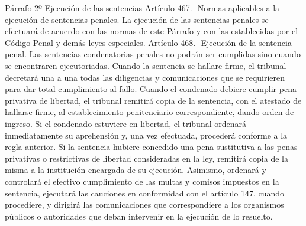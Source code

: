     Párrafo 2º Ejecución de las sentencias
    Artículo 467.- Normas aplicables a la ejecución de sentencias penales. La ejecución de las sentencias penales se efectuará de acuerdo con las normas de este Párrafo y con las establecidas por el Código Penal y demás leyes especiales.
    Artículo 468.- Ejecución de la sentencia penal. Las sentencias condenatorias penales no podrán ser cumplidas sino cuando se encontraren ejecutoriadas. Cuando la sentencia se hallare firme, el tribunal decretará una a una todas las diligencias y comunicaciones que se requirieren para dar total cumplimiento al fallo.
    Cuando el condenado debiere cumplir pena privativa de libertad, el tribunal remitirá copia de la sentencia, con el atestado de hallarse firme, al establecimiento penitenciario correspondiente, dando orden de ingreso. Si el condenado estuviere en libertad, el tribunal ordenará inmediatamente su aprehensión y, una vez efectuada, procederá conforme a la regla anterior.
    Si la sentencia hubiere concedido una pena sustitutiva a las penas privativas o restrictivas de libertad consideradas en la ley, remitirá copia de la misma a la institución encargada de su ejecución.
    Asimismo, ordenará y controlará el efectivo cumplimiento de las multas y comisos impuestos en la sentencia, ejecutará las cauciones en conformidad con el artículo 147, cuando procediere, y dirigirá las comunicaciones que correspondiere a los organismos públicos o autoridades que deban intervenir en la ejecución de lo resuelto.

